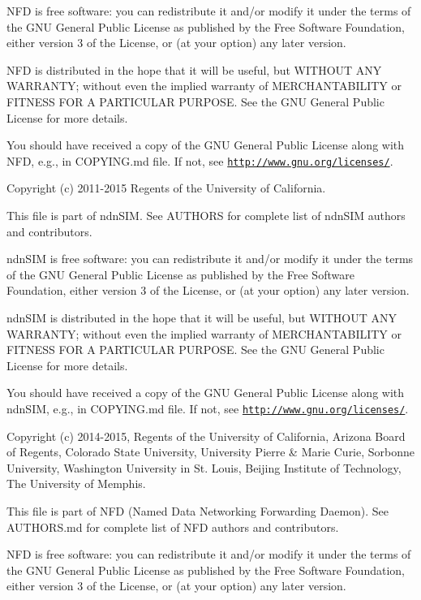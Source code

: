 N\+FD is free software\+: you can redistribute it and/or modify it under the terms of the G\+NU General Public License as published by the Free Software Foundation, either version 3 of the License, or (at your option) any later version.

N\+FD is distributed in the hope that it will be useful, but W\+I\+T\+H\+O\+UT A\+NY W\+A\+R\+R\+A\+N\+TY; without even the implied warranty of M\+E\+R\+C\+H\+A\+N\+T\+A\+B\+I\+L\+I\+TY or F\+I\+T\+N\+E\+SS F\+OR A P\+A\+R\+T\+I\+C\+U\+L\+AR P\+U\+R\+P\+O\+SE. See the G\+NU General Public License for more details.

You should have received a copy of the G\+NU General Public License along with N\+FD, e.\+g., in C\+O\+P\+Y\+I\+N\+G.\+md file. If not, see \href{http://www.gnu.org/licenses/}{\tt http\+://www.\+gnu.\+org/licenses/}.

Copyright (c) 2011-\/2015 Regents of the University of California.

This file is part of ndn\+S\+IM. See A\+U\+T\+H\+O\+RS for complete list of ndn\+S\+IM authors and contributors.

ndn\+S\+IM is free software\+: you can redistribute it and/or modify it under the terms of the G\+NU General Public License as published by the Free Software Foundation, either version 3 of the License, or (at your option) any later version.

ndn\+S\+IM is distributed in the hope that it will be useful, but W\+I\+T\+H\+O\+UT A\+NY W\+A\+R\+R\+A\+N\+TY; without even the implied warranty of M\+E\+R\+C\+H\+A\+N\+T\+A\+B\+I\+L\+I\+TY or F\+I\+T\+N\+E\+SS F\+OR A P\+A\+R\+T\+I\+C\+U\+L\+AR P\+U\+R\+P\+O\+SE. See the G\+NU General Public License for more details.

You should have received a copy of the G\+NU General Public License along with ndn\+S\+IM, e.\+g., in C\+O\+P\+Y\+I\+N\+G.\+md file. If not, see \href{http://www.gnu.org/licenses/}{\tt http\+://www.\+gnu.\+org/licenses/}.

Copyright (c) 2014-\/2015, Regents of the University of California, Arizona Board of Regents, Colorado State University, University Pierre \& Marie Curie, Sorbonne University, Washington University in St. Louis, Beijing Institute of Technology, The University of Memphis.

This file is part of N\+FD (Named Data Networking Forwarding Daemon). See A\+U\+T\+H\+O\+R\+S.\+md for complete list of N\+FD authors and contributors.

N\+FD is free software\+: you can redistribute it and/or modify it under the terms of the G\+NU General Public License as published by the Free Software Foundation, either version 3 of the License, or (at your option) any later version.

